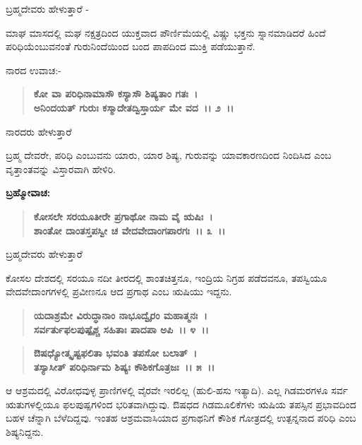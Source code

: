 \begin{flushleft}
ಬ್ರಹ್ಮದೇವರು ಹೇಳುತ್ತಾರೆ -
\end{flushleft}

ಮಾಘ ಮಾಸದಲ್ಲಿ ಮಘ ನಕ್ಷತ್ರದಿಂದ ಯುಕ್ತವಾದ ಪೌರ್ಣಿಮೆಯಲ್ಲಿ ವಿಷ್ಣು ಭಕ್ತನು ಸ್ನಾನಮಾಡಿದರೆ ಹಿಂದೆ ಪರಿಧಿಯೆಂಬುವನಂತೆ ಗುರುನಿಂದೆಯಿಂದ ಬಂದ ಪಾಪದಿಂದ ಮುಕ್ತಿ ಪಡೆಯುತ್ತಾನೆ. 

\noindent
ನಾರದ ಉವಾಚ:-

\begin{verse}
\textbf{ಕೋ ವಾ ಪರಿಧಿನಾಮಾಸೌ ಕಸ್ಯಾಸೌ ಶಿಷ್ಯತಾಂ ಗತಃ~।}\\\textbf{ಅನಿಂದಯತ್ ಗುರುಃ ಕಸ್ಮಾದೇತದ್ವಿಸ್ತಾರ್ಯ ಮೇ ವದ~।। ೨~।। }
\end{verse}

\begin{flushleft}
ನಾರದರು ಹೇಳುತ್ತಾರೆ\enginline{-}
\end{flushleft}

ಬ್ರಹ್ಮ ದೇವರೇ, ಪರಿಧಿ ಎಂಬುವನು ಯಾರು, ಯಾರ ಶಿಷ್ಯ, ಗುರುವನ್ನು ಯಾವ\break ಕಾರಣದಿಂದ ನಿಂದಿಸಿದ ಎಂಬ ವೃತ್ತಾಂತವನ್ನು ವಿಸ್ತಾರವಾಗಿ ಹೇಳಿರಿ.

\begin{flushleft}
\textbf{ಬ್ರಹ್ಮೋವಾಚ:\enginline{-} }
\end{flushleft}

\begin{verse}
\textbf{ಕೋಸಲೇ ಸರಯೂತೀರೇ ಪ್ರಗಾಥೋ ನಾಮ ವೈ ಋಷಿಃ~।}\\\textbf{ಶಾಂತೋ ದಾಂತಸ್ತಪಸ್ವೀ ಚ ವೇದವೇದಾಂಗಪಾರಗಃ~।। ೩~।।}
\end{verse}

\begin{flushleft}
ಬ್ರಹ್ಮದೇವರು ಹೇಳುತ್ತಾರೆ\enginline{-}
\end{flushleft}

ಕೋಸಲ ದೇಶದಲ್ಲಿ ಸರಯೂ ನದೀ ತೀರದಲ್ಲಿ ಶಾಂತಚಿತ್ತನೂ, ಇಂದ್ರಿಯ ನಿಗ್ರಹ ಪಡೆದವನೂ, ತಪಸ್ವಿಯೂ ವೇದವೇದಾಂಗಗಳಲ್ಲಿ ಪ್ರವೀಣನೂ ಆದ ಪ್ರಗಾಥ ಎಂಬ ಋಷಿಯು ಇದ್ದನು.

\begin{verse}
\textbf{ಯದಾಶ್ರಮೇ ವಿರುದ್ಧಾನಾಂ ನಾಭೂದ್ವೈರಂ ಮಹಾತ್ಮನಃ~।}\\\textbf{ಸರ್ವರ್ತುಫಲಪುಷ್ಪೈಶ್ಚ ಸಹಿತಾಃ ಪಾದಪಾ ಅಪಿ~।। ೪~।। }
\end{verse}

\begin{verse}
\textbf{ಔಷಧ್ಯೋತ್ಕೃಷ್ಟಫಲಿತಾ ಭವಂತಿ ತಪಸೋ ಬಲಾತ್~।}\\\textbf{ತಸ್ಯಾಸೀತ್ ಪರಿಧಿರ್ನಾಮ ಶಿಷ್ಯಃ ಕೌಶಿಕಗೊತ್ರಜಃ~।। ೫~।।}
\end{verse}

ಆ ಆಶ್ರಮದಲ್ಲಿ ವಿರೋಧವುಳ್ಳ ಪ್ರಾಣಿಗಳಲ್ಲಿ ವೈರವೇ ಇರಲಿಲ್ಲ (ಹುಲಿ-ಹಸು ಇತ್ಯಾದಿ). ಎಲ್ಲ ಗಿಡಮರಗಳೂ ಸರ್ವ ಋತುಗಳಲ್ಲಿಯೂ ಫಲಪುಷ್ಪಗಳಿಂದ ಭರಿತವಾಗಿದ್ದುವು. ಔಷಧದ ಗಿಡಮೂಲಿಕೆಗಳು ಋಷಿಯ ತಪಸ್ಸಿನ ಪ್ರಭಾವದಿಂದ ಬಹಳ ಚೆನ್ನಾಗಿ ಬೆಳೆದಿದ್ದವು. ಇಂತಹ ಆಶ್ರಮವಾಸಿಯಾದ ಪ್ರಗಾಥನಿಗೆ ಕೌಶಿಕ ಗೋತ್ರದಲ್ಲಿ ಉತ್ಪನ್ನನಾದ ಪರಿಧಿ ಎಂಬ ಶಿಷ್ಯನಿದ್ದನು.

